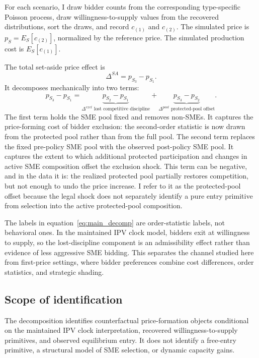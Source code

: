 For each scenario, I draw bidder counts from the corresponding type-specific
Poisson process, draw willingness-to-supply values from the recovered
distributions, sort the draws, and record $c_{(1)}$ and $c_{(2)}$. The simulated price is
$p_S=E_S[c_{(2)}]$, normalized by the reference price. The simulated
production cost is $E_S[c_{(1)}]$.

The total set-aside price effect is
\[
    \Delta^{SA}=p_{S_3}-p_{S_1}.
\]
It decomposes mechanically into two terms:
\begin{equation}\label{eq:main_decomp}
    p_{S_3}-p_{S_1}
    =
    \underbrace{p_{S_2}-p_{S_1}}_{\Delta^{excl}
    \text{ lost competitive discipline}}
    +
    \underbrace{p_{S_3}-p_{S_2}}_{\Delta^{pool}
    \text{ protected-pool offset}}.
\end{equation}
The first term holds the SME pool fixed and removes non-SMEs. It captures
the price-forming cost of bidder exclusion: the second-order statistic is
now drawn from the protected pool rather than from the full pool. The
second term replaces the fixed pre-policy SME pool with the observed
post-policy SME pool. It captures the extent to which additional protected
participation and changes in active SME composition offset the exclusion
shock. This term can be negative, and in the data it is: the realized
protected pool partially restores competition, but not enough to undo the
price increase. I refer to it as the protected-pool offset because the
legal shock does not separately identify a pure entry primitive from
selection into the active protected-pool composition.

The labels in equation~\eqref{eq:main_decomp} are order-statistic labels,
not behavioral ones. In the maintained IPV clock model, bidders exit at
willingness to supply, so the lost-discipline component is an admissibility
effect rather than evidence of less aggressive SME bidding. This separates
the channel studied here from first-price settings, where bidder preferences
combine cost differences, order statistics, and strategic shading.

\subsection{Scope of identification}

The decomposition identifies counterfactual price-formation objects
conditional on the maintained IPV clock interpretation, recovered
willingness-to-supply primitives, and observed equilibrium entry. It does
not identify a free-entry primitive, a structural model of SME selection,
or dynamic capacity gains.

